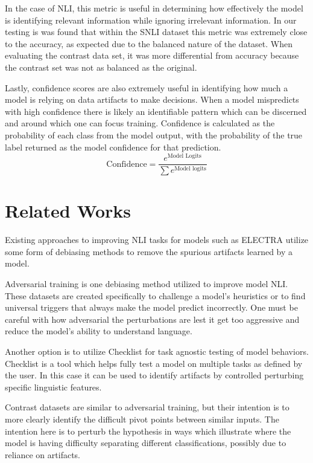 \documentclass[11pt]{article}
\begin{document}
In the case of NLI, this metric is useful in determining how effectively the model is identifying relevant information while ignoring irrelevant information.  In our testing is was found that within the SNLI dataset this metric was extremely close to the accuracy, as expected due to the balanced nature of the dataset.  When evaluating the contrast data set, it was more differential from accuracy because the contrast set was not as balanced as the original.

Lastly, confidence scores are also extremely useful in identifying how much a model is relying on data artifacts to make decisions. When a model mispredicts with high confidence there is likely an identifiable pattern which can be discerned and around which one can focus training. Confidence is calculated as the probability of each class from the model output, with the probability of the true label returned as the model confidence for that prediction.
\begin{equation*}
\text{Confidence} = \frac{e^{\text{Model Logits}}}{\sum e^{\text{Model logits}}}
\end{equation*}

\section{Related Works}
Existing approaches to improving NLI tasks for models such as ELECTRA utilize some form of debiasing methods to remove the spurious artifacts learned by a model.

Adversarial training is one debiasing method utilized to improve model NLI. 
 These datasets are created specifically to challenge a model's heuristics \citealp{adversarial1} or to find universal triggers that always make the model predict incorrectly. \citealp{wallace2021universaladversarialtriggersattacking}  One must be careful with how adversarial the perturbations are lest it get too aggressive and reduce the model's ability to understand language.

Another option is to utilize Checklist for task agnostic testing of model behaviors. Checklist is a tool which helps fully test a model on multiple tasks as defined by the user. In this case it can be used to identify artifacts by controlled perturbing specific linguistic features. \citealp{checklist}

Contrast datasets are similar to adversarial training, but their intention is to more clearly identify the difficult pivot points between similar inputs. The intention here is to perturb the hypothesis in ways which illustrate where the model is having difficulty separating different classifications, possibly due to reliance on artifacts.  \citealp{localdecisionboundaries}
\end{document}
